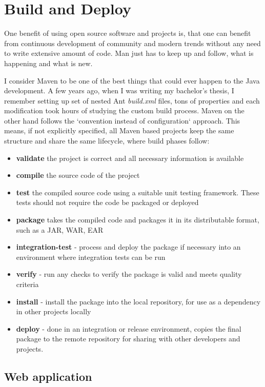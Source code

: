 \chapter{Build and Deploy}\label{app:deploy}

	One benefit of using open source software and projects is, that one can benefit from continuous development of community
	and modern trends without any need to write extensive amount of code. Man just has to keep up and follow, what is
	happening and what is new.
	
	I consider Maven to be one of the best things that could ever happen to the Java development. A few years ago, when I
	was writing my bachelor's thesis, I remember setting up set of nested Ant \textit{build.xml} files, tons of properties
	and each modification took hours of studying the custom build process. Maven on the other hand follows the `convention
	instead of configuration` approach. This means, if not explicitly specified, all Maven based projects keep the same
	structure and share the same lifecycle, where build phases follow:

	\begin{itemize}
		\item \textbf{validate} the project is correct and all necessary information is available
		\item \textbf{compile} the source code of the project
		\item \textbf{test} the compiled source code using a suitable unit testing framework. These tests should not require
		the code be packaged or deployed 
		\item \textbf{package} takes the compiled code and packages it in its distributable format, such as a JAR, WAR, EAR
		\item \textbf{integration-test} - process and deploy the package if necessary into an environment where integration
		tests can be run
		\item \textbf{verify} - run any checks to verify the package is valid and meets quality criteria
		\item \textbf{install} - install the package into the local repository, for use as a dependency in other projects
		locally
		\item \textbf{deploy} - done in an integration or release environment, copies the final package to the remote
		repository for sharing with other developers and projects.
	\end{itemize}
	
	\section{Web application}
	
